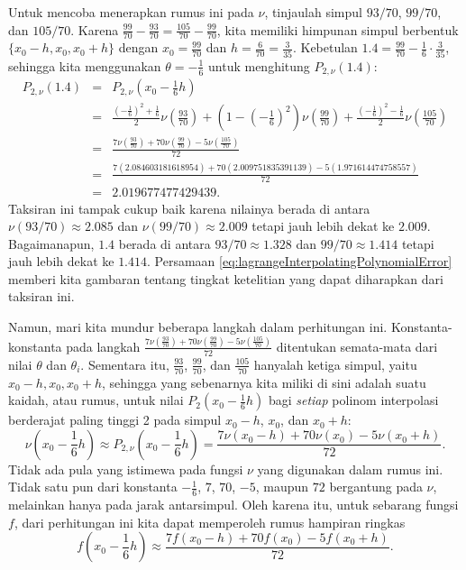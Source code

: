 Untuk mencoba menerapkan rumus ini pada $\nu$, tinjaulah simpul $93/70$,
$99/70$, dan $105/70$. Karena $\frac{99}{70}-\frac{93}{70}=\frac{105}{70}-\frac{99}{70}$,
kita memiliki himpunan simpul berbentuk $\{x_{0}-h,x_{0},x_{0}+h\}$
dengan $x_{0}=\frac{99}{70}$ dan $h=\frac{6}{70}=\frac{3}{35}$.
Kebetulan $1.4=\frac{99}{70}-\frac{1}{6}\cdot\frac{3}{35}$, sehingga
kita menggunakan $\theta=-\frac{1}{6}$ untuk menghitung $P_{2,\nu}(1.4)$:
\begin{eqnarray*}
P_{2,\nu}(1.4) & = & P_{2,\nu}\left(x_{0}-\frac{1}{6}h\right)\\
 & = & \frac{\left(-\frac{1}{6}\right)^{2}+\frac{1}{6}}{2}\nu\left(\frac{93}{70}\right)+\left(1-\left(-\frac{1}{6}\right)^{2}\right)\nu\left(\frac{99}{70}\right)+\frac{\left(-\frac{1}{6}\right)^{2}-\frac{1}{6}}{2}\nu\left(\frac{105}{70}\right)\\
 & = & \frac{7\nu\left(\frac{93}{70}\right)+70\nu\left(\frac{99}{70}\right)-5\nu\left(\frac{105}{70}\right)}{72}\\
 & = & \frac{7(2.084603181618954)+70(2.009751835391139)-5(1.971614474758557)}{72}\\
 & = & 2.019677477429439.
\end{eqnarray*}
Taksiran ini tampak cukup baik karena nilainya berada di antara $\nu(93/70)\approx2.085$
dan $\nu(99/70)\approx2.009$ tetapi jauh lebih dekat ke $2.009$.
Bagaimanapun, $1.4$ berada di antara $93/70\approx1.328$ dan $99/70\approx1.414$
tetapi jauh lebih dekat ke $1.414$. Persamaan \ref{eq:lagrangeInterpolatingPolynomialError}
memberi kita gambaran tentang tingkat ketelitian yang dapat diharapkan
dari taksiran ini.

Namun, mari kita mundur beberapa langkah dalam perhitungan ini. Konstanta-konstanta
pada langkah $\frac{7\nu\left(\frac{93}{70}\right)+70\nu\left(\frac{99}{70}\right)-5\nu\left(\frac{105}{70}\right)}{72}$
ditentukan semata-mata dari nilai $\theta$ dan $\theta_{i}$. Sementara
itu, $\frac{93}{70}$, $\frac{99}{70}$, dan $\frac{105}{70}$ hanyalah
ketiga simpul, yaitu $x_{0}-h,x_{0},x_{0}+h$, sehingga yang sebenarnya
kita miliki di sini adalah suatu kaidah, atau rumus, untuk nilai $P_{2}(x_{0}-\frac{1}{6}h)$
bagi \textit{setiap} polinom interpolasi berderajat paling tinggi
2 pada simpul $x_{0}-h$, $x_{0}$, dan $x_{0}+h$:
\[
\nu\left(x_{0}-\frac{1}{6}h\right)\approx P_{2,\nu}\left(x_{0}-\frac{1}{6}h\right)=\frac{7\nu(x_{0}-h)+70\nu(x_{0})-5\nu(x_{0}+h)}{72}.
\]
Tidak ada pula yang istimewa pada fungsi $\nu$ yang digunakan dalam
rumus ini. Tidak satu pun dari konstanta $-\frac{1}{6}$, $7$, $70$,
$-5$, maupun $72$ bergantung pada $\nu$, melainkan hanya pada jarak
antarsimpul. Oleh karena itu, untuk sebarang fungsi $f$, dari perhitungan
ini kita dapat memperoleh rumus hampiran ringkas
\begin{equation}
f\left(x_{0}-\frac{1}{6}h\right)\approx\frac{7f(x_{0}-h)+70f(x_{0})-5f(x_{0}+h)}{72}.\label{eq:p2formula}
\end{equation}

